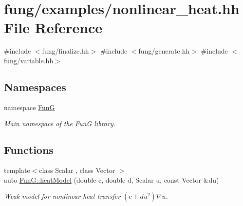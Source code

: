 \hypertarget{nonlinear__heat_8hh}{\section{fung/examples/nonlinear\-\_\-heat.hh \-File \-Reference}
\label{nonlinear__heat_8hh}
}
{\ttfamily \#include $<$fung/finalize.\-hh$>$}\*
{\ttfamily \#include $<$fung/generate.\-hh$>$}\*
{\ttfamily \#include $<$fung/variable.\-hh$>$}\*
\subsection*{\-Namespaces}
\begin{DoxyCompactItemize}
\item 
namespace \hyperlink{namespaceFunG}{\-Fun\-G}
\begin{DoxyCompactList}\small\item\em \-Main namespace of the \-Fun\-G library. \end{DoxyCompactList}\end{DoxyCompactItemize}
\subsection*{\-Functions}
\begin{DoxyCompactItemize}
\item 
{\footnotesize template$<$class Scalar , class Vector $>$ }\\auto \hyperlink{namespaceFunG_aab17a1468e61f58564333b3fcd7900d6}{\-Fun\-G\-::heat\-Model} (double c, double d, \-Scalar u, const \-Vector \&du)
\begin{DoxyCompactList}\small\item\em \-Weak model for nonlinear heat transfer $ (c+du^2)\nabla u $. \end{DoxyCompactList}\end{DoxyCompactItemize}

